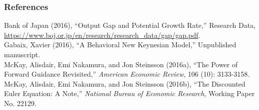 \documentclass{beamer}
\begin{document}

\begin{frame}
	\frametitle{References}
	\begin{flushleft}
		\footnotesize
		Bank of Japan (2016), ``Output Gap and Potential Growth Rate,'' Research Data, \url{https://www.boj.or.jp/en/research/research\_data/gap/gap.pdf}.\\
		\vspace{7pt}
		Gabaix, Xavier (2016), ``A Behavioral New Keynesian Model,'' Unpublished manuscript.\\
		\vspace{7pt}
		McKay, Alisdair, Emi Nakamura, and Jon Steinsson (2016a), ``The Power of Forward Guidance Revisited,'' \textit{American Economic Review}, 106 (10): 3133-3158.\\
		\vspace{7pt}
		McKay, Alisdair, Emi Nakamura, and Jon Steinsson (2016b), ``The Discounted Euler Equation: A Note,'' \textit{National Bureau of Economic Research}, Working Paper No. 22129.
	\end{flushleft}
\end{frame}

\end{document}
